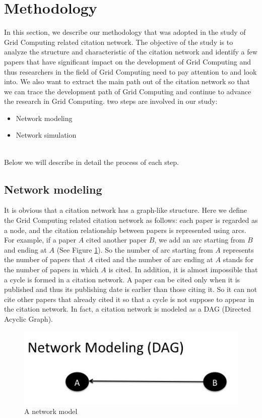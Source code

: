 \section{Methodology \label{S:Methodology}}
In this section, we describe our methodology that was adopted in the study of Grid Computing related citation network. The objective of the study is to analyze the structure and characteristic of the citation network and identify a few papers that have significant impact on the development of Grid Computing and thus researchers in the field of Grid Computing need to pay attention to and look into. We also want to extract the main path out of the citation network so that we can trace the development path of Grid Computing and continue to advance the research in Grid Computing. two steps are involved in our study:
~\\
\begin{itemize}
\item Network modeling
\item Network simulation
\end{itemize} 
~\\
Below we will describe in detail the process of each step.
\subsection{Network modeling}
It is obvious that a citation network has a graph-like structure. Here we define the Grid Computing related citation network as follows: each paper is regarded as a node, and the citation relationship between papers is represented using arcs. For example, if a paper $A$ cited another paper $B$, we add an arc starting from $B$ and ending at $A$ (See Figure \ref{F:model}).  So the number of arc starting from $A$ represents the number of papers that $A$ cited and the number of arc ending at $A$ stands for the number of papers in which $A$ is cited. In addition, it is almost impossible that a cycle is formed in a citation network. A paper can be cited only when it is published and thus its publishing date is earlier than those citing it. So it can not cite other papers that already cited it so that a cycle is not suppose to appear in the citation network. In fact, a citation network is modeled as a DAG (Directed Acyclic Graph). 

\begin{figure}[ht!]
\includegraphics [totalheight=0.13\textheight]{images/model.jpg}
\caption {A network model}
\label {F:model}
\end{figure}

